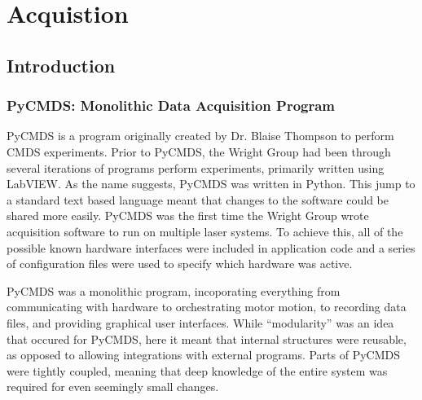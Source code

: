 \chapter{Acquistion} \label{cha:acq}

\newcommand\biab{\texttt{bluesky-in-a-box} }
\newcommand\wrightfakes{\texttt{wright-fakes} }
\newcommand\wrightplans{\texttt{wright-plans} }
\newcommand\blueskycmds{\texttt{bluesky-cmds} }
\newcommand\yaqccmds{\texttt{yaqc-cmds}}
\newcommand\yaqcqtpy{\texttt{yaqc-qtpy}}

\clearpage

\section{Introduction}

\subsection{PyCMDS: Monolithic Data Acquisition Program}


\Gls{PyCMDS} is a program originally created by Dr. Blaise Thompson to perform \gls{CMDS} experiments\cite{}.
Prior to PyCMDS, the Wright Group had been through several iterations of programs perform experiments, primarily written using LabVIEW\cite{}\cite{}.
As the name suggests, PyCMDS was written in Python.
This jump to a standard text based language meant that changes to the software could be shared more easily.
PyCMDS was the first time the Wright Group wrote acquisition software to run on multiple laser systems.
To achieve this, all of the possible known hardware interfaces were included in application code and a series of configuration files were used to specify which hardware was active.

PyCMDS was a monolithic program, incoporating everything from communicating with hardware to orchestrating motor motion, to recording data files, and providing graphical user interfaces.
While ``modularity'' was an idea that occured for PyCMDS, here it meant that internal structures were reusable, as opposed to allowing integrations with external programs.
Parts of PyCMDS were tightly coupled, meaning that deep knowledge of the entire system was required for even seemingly small changes.

